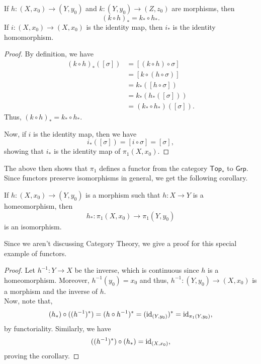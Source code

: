 \documentclass[12pt]{article}
\begin{document}
\begin{thm}[Functoriality]
	If $h:(X, x_0) \to (Y, y_0)$ and $k:(Y, y_0) \to (Z, z_0)$ are morphisms, then
	\begin{equation*} 
		(k \circ h)_* = k_* \circ h_*.
	\end{equation*}
	If $i:(X, x_0) \to (X, x_0)$ is the identity map, then $i_*$ is the identity homomorphism.
\end{thm}
\begin{proof} 
	By definition, we have
	\begin{align*} 
		(k \circ h)_*([\sigma]) &= [(k \circ h) \circ \sigma]\\
		&= [k \circ (h \circ \sigma)]\\
		&= k_*([h\circ \sigma])\\
		&= k_*(h_*([\sigma]))\\
		&= (k_* \circ h_*)([\sigma]).
	\end{align*}
	Thus, $(k \circ h)_* = k_* \circ h_*.$

	Now, if $i$ is the identity map, then we have
	\begin{equation*} 
		i_*([\sigma]) = [i \circ \sigma] = [\sigma],
	\end{equation*}
	showing that $i_*$ is the identity map of $\pi_1(X, x_0).$
\end{proof}
The above then shows that $\pi_1$ defines a functor from the category $\mathsf{Top}_*$ to $\mathsf{Grp}.$\\
Since functors preserve isomorphisms in general, we get the following corollary.
\begin{cor}
	If $h:(X, x_0) \to (Y, y_0)$ is a morphism such that $h:X \to Y$ is a homeomorphism, then
	\begin{equation*} 
		h_* : \pi_1(X, x_0) \to \pi_1(Y, y_0)
	\end{equation*}
	is an isomorphism.
\end{cor}
Since we aren't discussing Category Theory, we give a proof for this special example of functors.
\begin{proof} 
	Let $h^{-1}:Y \to X$ be the inverse, which is continuous since $h$ is a homeomorphism. Moreover, $h^{-1}(y_0) = x_0$ and thus, $h^{-1}:(Y, y_0) \to (X, x_0)$ is a morphism and the inverse of $h.$\\
	Now, note that,
	\begin{equation*} 
		(h_*)\circ((h^{-1})^*) = (h\circ h^{-1})^* = (\operatorname{id}_{(Y, y_0)})^* = \operatorname{id}_{\pi_1(Y, y_0)},
	\end{equation*}
	by functoriality. Similarly, we have
	\begin{equation*} 
		((h^{-1})^*)\circ(h_*) = \operatorname{id}_{(X, x_0)},
	\end{equation*}
	proving the corollary.
\end{proof}
%
%
\end{document}
